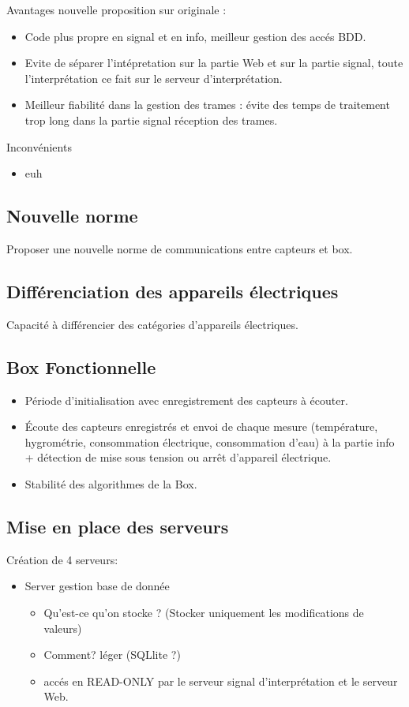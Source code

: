\documentclass[10pt,a4paper]{article}
\begin{document}
Avantages nouvelle proposition sur originale :
\begin{itemize}
  \item Code plus propre en signal et en info, meilleur gestion des accés BDD.
  \item Evite de séparer l'intépretation sur la partie Web et sur la partie signal, toute l'interprétation ce fait sur le serveur d'interprétation.
  \item Meilleur fiabilité dans la gestion des trames : évite des temps de traitement trop long dans la partie signal réception des trames.
\end{itemize}
Inconvénients
\begin{itemize}
  \item euh
\end{itemize}

\subsection{Nouvelle norme}
Proposer une nouvelle norme de communications entre capteurs et box.
\subsection{Différenciation des appareils électriques}
Capacité à différencier des catégories d'appareils électriques.

\subsection{Box Fonctionnelle}
\begin{itemize}
  \item Période d'initialisation avec enregistrement des capteurs à écouter.
  \item Écoute des capteurs enregistrés et envoi de chaque mesure (température, hygrométrie, consommation électrique, consommation d'eau) à la partie info + détection de mise sous tension ou arrêt d'appareil électrique.
  \item Stabilité des algorithmes de la Box.
\end{itemize}

\subsection{Mise en place des serveurs}

Création de 4 serveurs:

\begin{itemize}
\item Server gestion base de donnée
\begin{itemize}
\item Qu'est-ce qu'on stocke ? (Stocker uniquement les modifications de valeurs)
\item Comment? léger (SQLlite ?)
\item accés en READ-ONLY par le serveur signal d'interprétation et le serveur Web.
\end{itemize}
\end{itemize}
\end{document}
